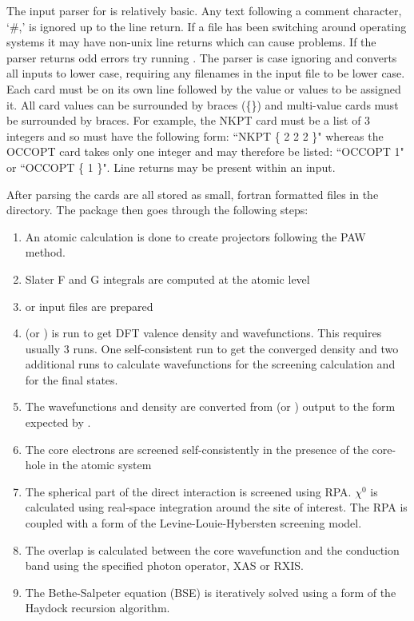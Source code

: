 \documentclass[11pt]{report}
\begin{document}
The input parser for  is relatively basic. Any text following a comment character, `\#,' is ignored up to the line return. If a file has been switching around operating systems it may have non-unix line returns which can cause problems. If the parser returns odd errors try running . The parser is case ignoring and converts all inputs to lower case, requiring any filenames in the input file to be lower case. Each card must be on its own line followed by the value or values to be assigned it. All card values can be surrounded by braces (\{\}) and multi-value cards must be surrounded by braces. For example, the NKPT card must be a list of 3 integers and so must have the following form: ``NKPT \{ 2 2 2 \}" whereas the OCCOPT card takes only one integer and may therefore be listed: ``OCCOPT 1" or ``OCCOPT \{ 1 \}". Line returns may be present within an input. 

After parsing the cards are all stored as small, fortran formatted files in the  directory. The package then goes through the following steps:
\begin{enumerate}
\item An atomic calculation is done to create projectors following the PAW method.
\item Slater F and G integrals are computed at the atomic level
\item {} or  input files are prepared
\item {} (or ) is run to get DFT valence density and wavefunctions. This requires usually 3 runs. One self-consistent run to get the converged density and two additional runs to calculate wavefunctions for the screening calculation and for the final states.
\item The wavefunctions and density are converted from  (or )  output to the form expected by .
\item The core electrons are screened self-consistently in the presence of the core-hole in the atomic system
\item The spherical part of the direct interaction is screened using RPA. $\chi^0$ is calculated using real-space integration around the site of interest. The RPA is coupled with a form of the Levine-Louie-Hybersten screening model.
\item The overlap is calculated between the core wavefunction and the conduction band using the specified photon operator, XAS or RXIS.
\item The Bethe-Salpeter equation (BSE) is iteratively solved using a form of the Haydock recursion algorithm.
\end{enumerate}
\end{document}
